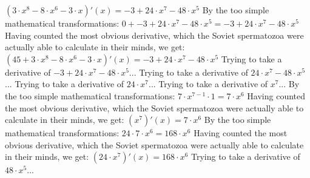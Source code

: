 \documentclass[a4paper, 12pt]{article}
\begin{document}
$({{{{3} \cdot {{x} ^ {8}}} - {{8} \cdot {{x} ^ {6}}}} - {{3} \cdot {x}}})'(x) = {{-3} + {{{24} \cdot {{x} ^ {7}}} - {{48} \cdot {{x} ^ {5}}}}}$\newline
\newline
By the too simple mathematical transformations:
 ${{0} + {{-3} + {{{24} \cdot {{x} ^ {7}}} - {{48} \cdot {{x} ^ {5}}}}}} = {{-3} + {{{24} \cdot {{x} ^ {7}}} - {{48} \cdot {{x} ^ {5}}}}}$ 
 \newline
 \newline 
Having counted the most obvious derivative, which the Soviet spermatozoa were actually able to calculate in their minds, we get:
$({{45} + {{{{3} \cdot {{x} ^ {8}}} - {{8} \cdot {{x} ^ {6}}}} - {{3} \cdot {x}}}})'(x) = {{-3} + {{{24} \cdot {{x} ^ {7}}} - {{48} \cdot {{x} ^ {5}}}}}$\newline
\newline
Trying to take a derivative of ${{-3} + {{{24} \cdot {{x} ^ {7}}} - {{48} \cdot {{x} ^ {5}}}}}$...\newline
\newline
Trying to take a derivative of ${{{24} \cdot {{x} ^ {7}}} - {{48} \cdot {{x} ^ {5}}}}$...\newline
\newline
Trying to take a derivative of ${{24} \cdot {{x} ^ {7}}}$...\newline
\newline
Trying to take a derivative of ${{x} ^ {7}}$...\newline
\newline
By the too simple mathematical transformations:
 ${{{7} \cdot {{x} ^ {{7} - {1}}}} \cdot {1}} = {{7} \cdot {{x} ^ {6}}}$ 
 \newline
 \newline 
Having counted the most obvious derivative, which the Soviet spermatozoa were actually able to calculate in their minds, we get:
$({{x} ^ {7}})'(x) = {{7} \cdot {{x} ^ {6}}}$\newline
\newline
By the too simple mathematical transformations:
 ${{24} \cdot {{7} \cdot {{x} ^ {6}}}} = {{168} \cdot {{x} ^ {6}}}$ 
 \newline
 \newline 
Having counted the most obvious derivative, which the Soviet spermatozoa were actually able to calculate in their minds, we get:
$({{24} \cdot {{x} ^ {7}}})'(x) = {{168} \cdot {{x} ^ {6}}}$\newline
\newline
Trying to take a derivative of ${{48} \cdot {{x} ^ {5}}}$...\newline
\end{document}
